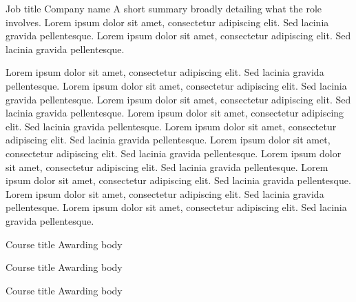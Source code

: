 \documentclass[letterpaper]{ReadableCV}
\begin{document}
{Job title}
{Company name}
{A short summary broadly detailing what the role involves. Lorem ipsum dolor sit amet, consectetur adipiscing elit. Sed lacinia gravida pellentesque. Lorem ipsum dolor sit amet, consectetur adipiscing elit. Sed lacinia gravida pellentesque.}

{Lorem ipsum dolor sit amet, consectetur adipiscing elit. Sed lacinia gravida pellentesque. Lorem ipsum dolor sit amet, consectetur adipiscing elit. Sed lacinia gravida pellentesque.}
{Lorem ipsum dolor sit amet, consectetur adipiscing elit. Sed lacinia gravida pellentesque. Lorem ipsum dolor sit amet, consectetur adipiscing elit. Sed lacinia gravida pellentesque.}
{Lorem ipsum dolor sit amet, consectetur adipiscing elit. Sed lacinia gravida pellentesque. Lorem ipsum dolor sit amet, consectetur adipiscing elit. Sed lacinia gravida pellentesque.}
{Lorem ipsum dolor sit amet, consectetur adipiscing elit. Sed lacinia gravida pellentesque. Lorem ipsum dolor sit amet, consectetur adipiscing elit. Sed lacinia gravida pellentesque.}
{Lorem ipsum dolor sit amet, consectetur adipiscing elit. Sed lacinia gravida pellentesque. Lorem ipsum dolor sit amet, consectetur adipiscing elit. Sed lacinia gravida pellentesque.}


\newpage


{Course title}
{Awarding body}{}

{Course title}
{Awarding body}{}

{Course title}
{Awarding body}{}
\end{document}
